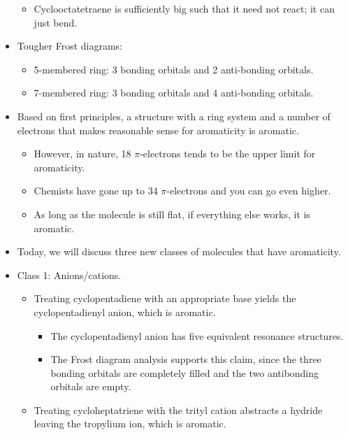\documentclass[../notes.tex]{subfiles}
\begin{document}
\begin{itemize}
\begin{itemize}
        \item Cyclooctatetraene is sufficiently big such that it need not react; it can just bend.
    \end{itemize}
    \item Tougher Frost diagrams:
    \begin{itemize}
        \item 5-membered ring: 3 bonding orbitals and 2 anti-bonding orbitals.
        \item 7-membered ring: 3 bonding orbitals and 4 anti-bonding orbitals.
    \end{itemize}
    \item Based on first principles, a structure with a ring system and a number of electrons that makes reasonable sense for aromaticity is aromatic.
    \begin{itemize}
        \item However, in nature, 18 $\pi$-electrons tends to be the upper limit for aromaticity.
        \item Chemists have gone up to 34 $\pi$-electrons and you can go even higher.
        \item As long as the molecule is still flat, if everything else works, it is aromatic.
    \end{itemize}
    \item Today, we will discuss three new classes of molecules that have aromaticity.
    \item Class 1: Anions/cations.
    \begin{itemize}
        \item Treating cyclopentadiene with an appropriate base yields the cyclopentadienyl anion, which is aromatic.
        \begin{itemize}
            \item The cyclopentadienyl anion has five equivalent resonance structures.
            \item The Frost diagram analysis supports this claim, since the three bonding orbitals are completely filled and the two antibonding orbitals are empty.
        \end{itemize}
        \item Treating cycloheptatriene with the trityl cation abstracts a hydride leaving the tropylium ion, which is aromatic.
        \begin{figure}[h!]
            \centering
            \footnotesize

\end{figure}
\end{itemize}
\end{itemize}
\end{document}

